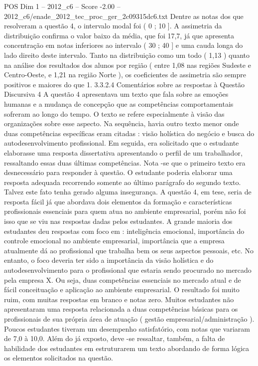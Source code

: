 \begin{textsample}{POS Dim 1 – 2012\_c6 – Score -2.00 – 2012\_c6/enade\_2012\_tec\_proc\_ger\_2c09315dc6.txt}
Dentre as notas dos que resolveram a questão 4, o intervalo modal foi ( 0 ; 10 ].
A assimetria da distribuição confirma o valor baixo da média, que foi 17,7, já que apresenta concentração em notas inferiores ao intervalo ( 30 ; 40 ] e uma cauda longa do lado direito deste intervalo.
Tanto na distribuição como um todo ( 1,13 ) quanto na análise dos resultados dos alunos por região ( entre 1,08 nas regiões Sudeste e Centro-Oeste, e 1,21 na região Norte ), os coeficientes de assimetria são sempre positivos e maiores do que 1. 3.3.2.4 Comentários sobre as respostas à Questão Discursiva 4 A questão 4 apresentava um texto que fala sobre as emoções humanas e a mudança de concepção que as competências comportamentais sofreram ao longo do tempo.
O texto se refere especialmente à visão das organizações sobre esse aspecto.
Na sequência, havia outro texto menor onde duas competências específicas eram citadas : visão holística do negócio e busca do autodesenvolvimento profissional.
Em seguida, era solicitado que o estudante elaborasse uma resposta dissertativa apresentando o perfil de um trabalhador, ressaltando essas duas últimas competências.
Nota -se que o primeiro texto era desnecessário para responder à questão.
O estudante poderia elaborar uma resposta adequada recorrendo somente ao último parágrafo do segundo texto.
Talvez este fato tenha gerado alguma insegurança.
A questão 4, em tese, seria de resposta fácil já que abordava dois elementos da formação e características profissionais essenciais para quem atua no ambiente empresarial, porém não foi isso que se viu nas respostas dadas pelos estudantes.
A grande maioria dos estudantes deu respostas com foco em : inteligência emocional, importância do controle emocional no ambiente empresarial, importância que a empresa atualmente dá ao profissional que trabalha bem os seus aspectos pessoais, etc.
No entanto, o foco deveria ter sido a importância da visão holística e do autodesenvolvimento para o profissional que estaria sendo procurado no mercado pela empresa X.
Ou seja, duas competências essenciais no mercado atual e de fácil conceituação e aplicação ao ambiente empresarial.
O resultado foi muito ruim, com muitas respostas em branco e notas zero.
Muitos estudantes não apresentaram uma resposta relacionada a duas competências básicas para os profissionais de sua própria área de atuação ( gestão empresarial/administração ).
Poucos estudantes tiveram um desempenho satisfatório, com notas que variaram de 7,0 à 10,0.
Além do já exposto, deve -se ressaltar, também, a falta de habilidade dos estudantes em estruturarem um texto abordando de forma lógica os elementos solicitados na questão.

\end{textsample}
